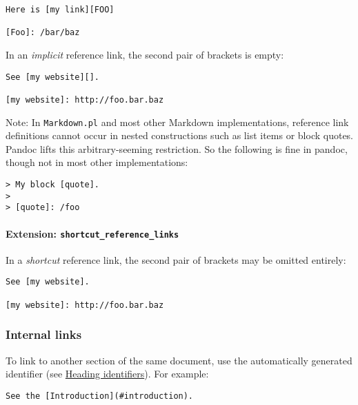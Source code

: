 \begin{verbatim}
Here is [my link][FOO]

[Foo]: /bar/baz
\end{verbatim}

In an \emph{implicit} reference link, the second pair of brackets is
empty:

\begin{verbatim}
See [my website][].

[my website]: http://foo.bar.baz
\end{verbatim}

Note: In \texttt{Markdown.pl} and most other Markdown implementations,
reference link definitions cannot occur in nested constructions such as
list items or block quotes. Pandoc lifts this arbitrary-seeming
restriction. So the following is fine in pandoc, though not in most
other implementations:

\begin{verbatim}
> My block [quote].
>
> [quote]: /foo
\end{verbatim}

\hypertarget{extension-shortcut_reference_links}{%
\paragraph{\texorpdfstring{Extension:
\texttt{shortcut\_reference\_links}}{Extension: shortcut\_reference\_links}}\label{extension-shortcut_reference_links}}

In a \emph{shortcut} reference link, the second pair of brackets may be
omitted entirely:

\begin{verbatim}
See [my website].

[my website]: http://foo.bar.baz
\end{verbatim}

\hypertarget{internal-links}{%
\subsubsection{Internal links}\label{internal-links}}

To link to another section of the same document, use the automatically
generated identifier (see
\protect\hyperlink{heading-identifiers}{Heading identifiers}). For
example:

\begin{verbatim}
See the [Introduction](#introduction).
\end{verbatim}

